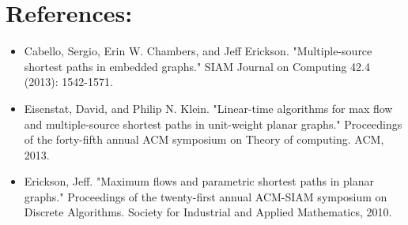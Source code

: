 \documentclass{article}
\begin{document}
\newpage
\section{References:}
\begin{itemize}
\item Cabello, Sergio, Erin W. Chambers, and Jeff Erickson. "Multiple-source 
  shortest paths in embedded graphs." SIAM Journal on Computing 42.4 (2013): 1542-1571.
\item Eisenstat, David, and Philip N. Klein. "Linear-time algorithms for max 
  flow and multiple-source shortest paths in unit-weight planar graphs." 
  Proceedings of the forty-fifth annual ACM symposium on Theory of computing. ACM, 2013.
\item Erickson, Jeff. "Maximum flows and parametric shortest paths in planar graphs." 
  Proceedings of the twenty-first annual ACM-SIAM symposium on Discrete Algorithms. 
  Society for Industrial and Applied Mathematics, 2010.
\end{itemize}
\end{document}

